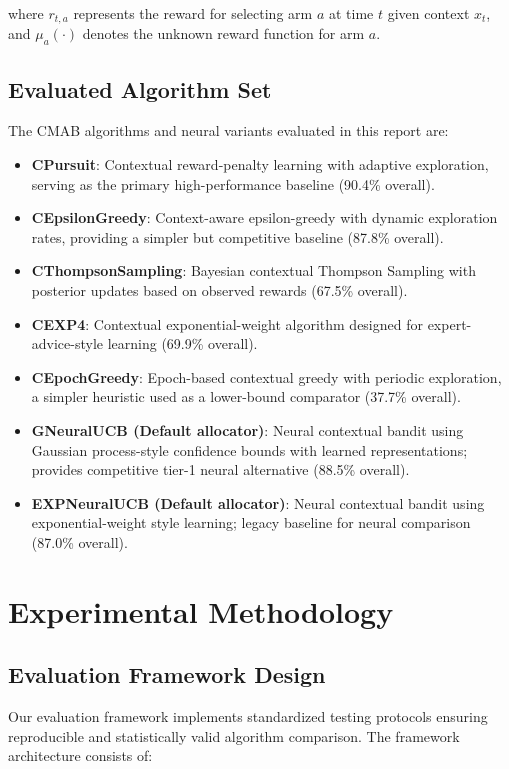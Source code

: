\documentclass[12pt,a4paper]{article}
\begin{document}
where $r_{t,a}$ represents the reward for selecting arm $a$ at time $t$ given context $x_t$, and $\mu_a(\cdot)$ denotes the unknown reward function for arm $a$.

\subsection{Evaluated Algorithm Set}

The CMAB algorithms and neural variants evaluated in this report are:

\begin{itemize}
\item \textbf{CPursuit}: Contextual reward-penalty learning with adaptive exploration, serving as the primary high-performance baseline (90.4\% overall).
\item \textbf{CEpsilonGreedy}: Context-aware epsilon-greedy with dynamic exploration rates, providing a simpler but competitive baseline (87.8\% overall).
\item \textbf{CThompsonSampling}: Bayesian contextual Thompson Sampling with posterior updates based on observed rewards (67.5\% overall).
\item \textbf{CEXP4}: Contextual exponential-weight algorithm designed for expert-advice-style learning (69.9\% overall).
\item \textbf{CEpochGreedy}: Epoch-based contextual greedy with periodic exploration, a simpler heuristic used as a lower-bound comparator (37.7\% overall).
\item \textbf{GNeuralUCB (Default allocator)}: Neural contextual bandit using Gaussian process-style confidence bounds with learned representations; provides competitive tier-1 neural alternative (88.5\% overall).
\item \textbf{EXPNeuralUCB (Default allocator)}: Neural contextual bandit using exponential-weight style learning; legacy baseline for neural comparison (87.0\% overall).
\end{itemize}

\section{Experimental Methodology}

\subsection{Evaluation Framework Design}

Our evaluation framework implements standardized testing protocols ensuring reproducible and statistically valid algorithm comparison. The framework architecture consists of:
\end{document}
